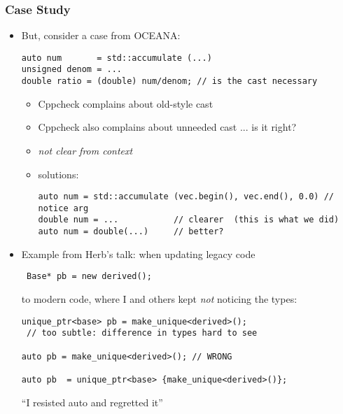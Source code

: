\begin{frame}[fragile]
\frametitle{Case Study}
\begin{itemize}[<+->]
\item But, consider a case from OCEANA:
{\scriptsize \begin{verbatim}
auto num       = std::accumulate (...)
unsigned denom = ...
double ratio = (double) num/denom; // is the cast necessary
\end{verbatim} }
  \begin{itemize}
    \item Cppcheck complains about old-style cast
    \item Cppcheck also complains about unneeded cast ... is it right?
    \item \emph{not clear from context}
    \item solutions:
      {\scriptsize \begin{verbatim}
auto num = std::accumulate (vec.begin(), vec.end(), 0.0) // notice arg
double num = ...           // clearer  (this is what we did)
auto num = double(...)     // better?
\end{verbatim} }
\end{itemize}
\item Example from Herb's talk: when updating legacy code
 {\scriptsize \begin{verbatim} Base* pb = new derived(); \end{verbatim} }
to modern code, where I and others kept \emph{not} noticing the types:
 {\scriptsize \begin{verbatim} 
unique_ptr<base> pb = make_unique<derived>();
 // too subtle: difference in types hard to see

auto pb = make_unique<derived>(); // WRONG

auto pb  = unique_ptr<base> {make_unique<derived>()};
\end{verbatim} }
``I resisted auto and regretted it''
\end{itemize}
\end{frame}

